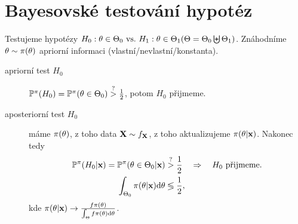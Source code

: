 \chapter{Bayesovské testování hypotéz}
Testujeme hypotézy $H_0: \theta\in\Theta_0 ~\text{vs.}~ H_1: \theta\in\Theta_1 (\Theta
=\Theta_0 \biguplus \Theta_1)$. Znáhodníme $\theta\sim\pi(\theta)$ apriorní informaci (vlastní/nevlastní/konstanta).
\begin{description}
	\item[apriorní test $H_0$] $\mathbb{P}^\pi(H_0)=\mathbb{P}^\pi(\theta\in\Theta_0)\stackrel{?}{>}\frac{1}{2}$, potom $H_0$ přijmeme.
	\item[aposteriorní test $H_0$] máme $\pi(\theta)$, z toho data $\textbf{X}\sim f_{\textbf{X}}$, z toho aktualizujeme $\pi(\theta|\textbf{x})$. Nakonec tedy 
	\[
	\begin{split}
	 \mathbb{P}^\pi(H_0|\textbf{x})=\mathbb{P}^\pi(\theta\in\Theta_0|\textbf{x})&\stackrel{?}{>}\frac{1}{2}\quad\Rightarrow\quad H_0\text{ přijmeme.}\\
	 \int_{\Theta_0}\pi(\theta|\textbf{x})\mathrm{d}\theta & \lessgtr \frac{1}{2},
	\end{split}
	\]
	kde $\pi(\theta|\textbf{x})\to \frac{f\pi(\theta)}{\int_\Theta f\pi(\theta)\mathrm{d}\theta}$.
\end{description}

